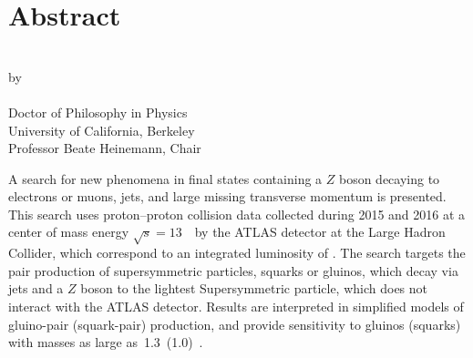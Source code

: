 


\begingroup
\let\clearpage\relax
\let\cleardoublepage\relax
\let\cleardoublepage\relax

\chapter*{Abstract}

\begin{center}
\myTitle \\ \bigskip
by \\ \bigskip
\myName \\ \bigskip
Doctor of Philosophy in Physics \\ \smallskip
University of California, Berkeley \\ \smallskip
Professor Beate Heinemann, Chair \\
\end{center}

\vspace{2cm}

A search for new phenomena in final states containing a $Z$ boson decaying to electrons or muons, jets, and large missing transverse momentum is presented. This search uses proton--proton collision data collected during 2015 and 2016 at a center of mass energy $\sqrt{s}=13$~\TeV\ by the ATLAS detector at the Large Hadron Collider, which correspond to an integrated luminosity of \lumi. The search targets the pair production of supersymmetric particles, squarks or gluinos, which decay via jets and a $Z$ boson to the lightest Supersymmetric particle, which does not interact with the ATLAS detector. Results are interpreted in simplified models of gluino-pair (squark-pair) production, and provide sensitivity to gluinos (squarks) with masses as large as~1.3~(1.0)~\TeV.

\endgroup			

\vfill



